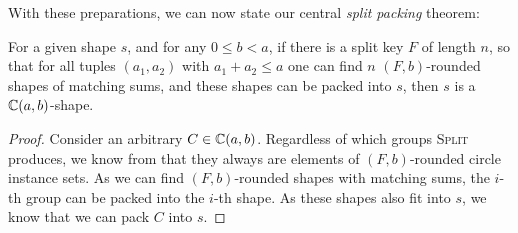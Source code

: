 \documentclass[a4paper,style=print,bibliography=totoc,nexus,lnum,extramargin]{tubsbook}
\begin{document}


%

With these preparations, we can now state our central \emph{split packing} theorem:

\begin{theorem}\label{th:splitpack}
    For a given shape $s$, and for any $0 \le b < a$, if there is a split key $F$ of length $n$, so that for all tuples $(a_1, a_2)$ with $a_1 + a_2 \le a$
    one can find $n$ $(F,b)$-rounded shapes of matching sums,
    and these shapes can be packed into $s$, then $s$ is a $\mathbb{C}(a,b)$-shape.
\end{theorem}

\begin{proof}
    Consider an arbitrary $C \in \mathbb{C}(a,b)$. Regardless of which groups \textsc{Split} produces, we know from  that they always are elements of $(F,b)$-rounded circle instance sets.
    As we can find $(F,b)$-rounded shapes with matching sums, the $i$-th group can be packed into the $i$-th shape.
    As these shapes also fit into $s$, we know that we can pack $C$ into $s$.
\end{proof}
\end{document}
